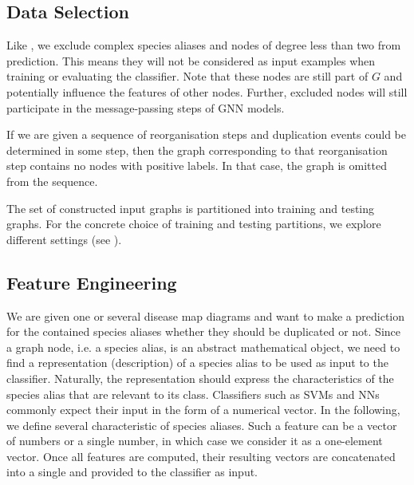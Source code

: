 \documentclass[
	fontsize=10pt, %
	twoside=false, %
	secnumdepth=1, %
  toc=indentunnumbered %
]{kaobook}
\begin{document}
\subsection{Data Selection}


Like \nielsen{}, we exclude complex species aliases and nodes of degree less than
two from prediction. This means they will not be considered as input examples
when training or evaluating the classifier. Note that these nodes are still part
of $G$ and potentially influence the features of other nodes. Further, excluded
nodes will still participate in the message-passing steps of GNN models.

If we are given a sequence of reorganisation steps and duplication events could
be determined in some step, then the graph corresponding to that reorganisation
step contains no nodes with positive labels. In that case, the graph is omitted
from the sequence. 

The set of constructed input graphs is partitioned into training and
testing graphs. For the concrete choice of training and testing partitions, we
explore different settings (see ).




\subsection{Feature Engineering}
\label{sec:feature-engineering}

We are given one or several disease map diagrams and want to make a prediction
for the contained species aliases whether they should be duplicated or not.
Since a graph node, i.e. a species alias, is an abstract mathematical object, we
need to find a representation (description) of a species alias to be used as
input to the classifier. Naturally, the representation should express the
characteristics of the species alias that are relevant to its class.
Classifiers such as SVMs and NNs commonly expect their input in the form of a
numerical vector.
%
In the following, we define several characteristic  of
species aliases. Such a feature can be a vector of numbers or a single
number, in which case we consider it as a one-element vector. Once all
features are computed, their resulting vectors are concatenated into a
single  and provided to the classifier as input.
\end{document}
